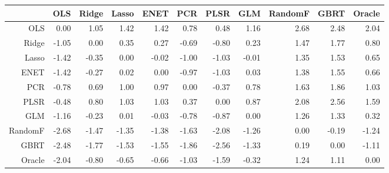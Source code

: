 \begin{table}[ht]
\centering
\begin{tabular}{rrrrrrrrrrr}
  \hline
 & OLS & Ridge & Lasso & ENET & PCR & PLSR & GLM & RandomF & GBRT & Oracle \\ 
  \hline
OLS & 0.00 & 1.05 & 1.42 & 1.42 & 0.78 & 0.48 & 1.16 & 2.68 & 2.48 & 2.04 \\ 
  Ridge & -1.05 & 0.00 & 0.35 & 0.27 & -0.69 & -0.80 & 0.23 & 1.47 & 1.77 & 0.80 \\ 
  Lasso & -1.42 & -0.35 & 0.00 & -0.02 & -1.00 & -1.03 & -0.01 & 1.35 & 1.53 & 0.65 \\ 
  ENET & -1.42 & -0.27 & 0.02 & 0.00 & -0.97 & -1.03 & 0.03 & 1.38 & 1.55 & 0.66 \\ 
  PCR & -0.78 & 0.69 & 1.00 & 0.97 & 0.00 & -0.37 & 0.78 & 1.63 & 1.86 & 1.03 \\ 
  PLSR & -0.48 & 0.80 & 1.03 & 1.03 & 0.37 & 0.00 & 0.87 & 2.08 & 2.56 & 1.59 \\ 
  GLM & -1.16 & -0.23 & 0.01 & -0.03 & -0.78 & -0.87 & 0.00 & 1.26 & 1.33 & 0.32 \\ 
  RandomF & -2.68 & -1.47 & -1.35 & -1.38 & -1.63 & -2.08 & -1.26 & 0.00 & -0.19 & -1.24 \\ 
  GBRT & -2.48 & -1.77 & -1.53 & -1.55 & -1.86 & -2.56 & -1.33 & 0.19 & 0.00 & -1.11 \\ 
  Oracle & -2.04 & -0.80 & -0.65 & -0.66 & -1.03 & -1.59 & -0.32 & 1.24 & 1.11 & 0.00 \\ 
   \hline
\end{tabular}
\end{table}
